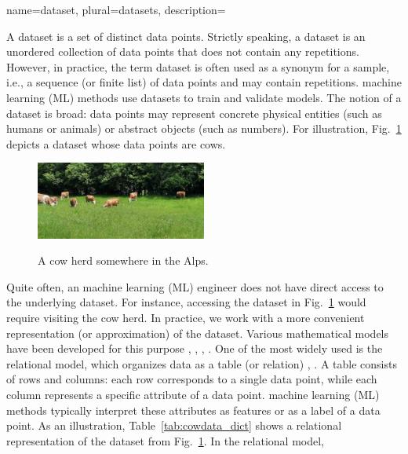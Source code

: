 {
{name={dataset}, plural={datasets},
	description={A dataset is a set of distinct data points. 
	Strictly speaking, a dataset is an unordered collection of data points 
	that does not contain any repetitions. However, in practice, the term dataset 
    is often used as a synonym for a sample, i.e., a sequence (or finite list) 
	of data points and may contain repetitions. 
	machine learning (ML) methods use datasets to train and validate models. 
	The notion of a dataset is broad: data points may represent concrete 
	physical entities (such as humans or animals) or abstract objects (such as numbers). 
	For illustration, Fig.~\ref{fig_cows_dataset_dict} depicts a dataset whose 
	data points are cows.	
		\begin{figure}[H]
			\begin{center}
			\label{fig:cowsintheswissalps_dict}
			\includegraphics[width=0.5\textwidth]{assets/CowsAustria.jpg}
		  	\end{center}
			\caption{\label{fig_cows_dataset_dict}A cow herd somewhere in the Alps.}
	 	\end{figure}
		Quite often, an machine learning (ML) engineer does not have direct access to the underlying dataset. 
		For instance, accessing the dataset in Fig.~\ref{fig_cows_dataset_dict} would require 
		visiting the cow herd. In practice, we work with a more convenient 
		representation (or approximation) of the dataset. Various mathematical models 
		have been developed for this purpose \cite{silberschatz2019database}, \cite{abiteboul1995foundations}, 
		\cite{hoberman2009data}, \cite{ramakrishnan2002database}. One of the most widely used is 
		the relational model, which organizes data as a table (or relation) 
		\cite{codd1970relational}, \cite{silberschatz2019database}. A table consists of 
		rows and columns: each row corresponds to a single data point, while each 
		column represents a specific attribute of a data point. 
		machine learning (ML) methods typically interpret these attributes as features 
		or as a label of a data point. As an illustration, 
		Table~\ref{tab:cowdata_dict} shows a relational representation of the 
		dataset from Fig.~\ref{fig_cows_dataset_dict}. In the relational model, 
}}}
